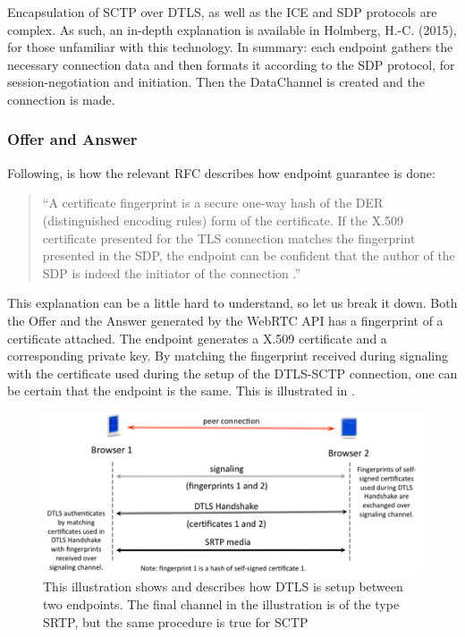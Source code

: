     Encapsulation of SCTP over DTLS, as well as the ICE and SDP protocols are complex. As such, an in-depth explanation is available in Holmberg, H.-C. (2015)\cite{url_webrtc_data}, for those unfamiliar with this technology. In summary: each endpoint gathers the necessary connection data and then formats it according to the SDP protocol, for session-negotiation and initiation. Then the DataChannel is created and the connection is made.
    \subsubsection*{Offer and Answer}
    \label{sec:webrtc_off}
    Following, is how the relevant RFC describes how endpoint guarantee is done:
    \begin{quotation}
        \enquote{A certificate fingerprint is a secure one-way hash of the DER (distinguished encoding rules) form of the certificate. If the X.509 certificate presented for the TLS connection matches the fingerprint presented in the SDP, the endpoint can be confident that the author of the SDP is indeed the initiator of the connection \cite{ar_tls_sdp}.}
    \end{quotation}
    This explanation can be a little hard to understand, so let us break it down. Both the Offer and the Answer generated by the WebRTC API has a fingerprint of a certificate attached. The endpoint generates a X.509 certificate and a corresponding private key. By matching the fingerprint received during signaling with the certificate used during the setup of the DTLS-SCTP connection, one can be certain that the endpoint is the same. This is illustrated in .
    \begin{figure}[t]
      \centering
      \includegraphics[width=\textwidth]{Figures/DTLS_Exchange}
      \decoRule
      \caption[DTLS setup]{This illustration shows and describes how DTLS is setup between two endpoints. The final channel in the illustration is of the type SRTP, but the same procedure is true for SCTP \cite{WebRTCManMiddle2015}}
      \label{fig:DTLS_setup}
    \end{figure}
